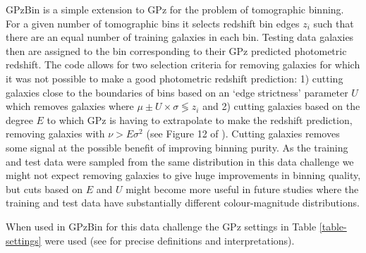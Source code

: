 \documentclass[twocolumn,twocolappendix]{aastex63}
\begin{document}


GPzBin is a simple extension to GPz for the problem of tomographic binning. For
a given number of tomographic bins it selects redshift bin edges $z_{i}$ such
that there are an equal number of training galaxies in each bin. Testing data
galaxies then are assigned to the bin corresponding to their GPz predicted
photometric redshift. The code allows for two selection criteria for removing
galaxies for which it was not possible to make a good photometric redshift
prediction: 1) cutting galaxies close to the boundaries of bins based on an
`edge strictness' parameter $U$ which removes galaxies where $\mu\pm U \times
\sigma \lessgtr z_i$ and 2) cutting galaxies based on the degree $E$ to which
GPz is having to extrapolate to make the redshift prediction, removing galaxies
with $\nu>E\sigma^2$ (see Figure 12 of \citealp{Hatfield2020}). Cutting galaxies
removes some signal at the possible benefit of improving binning purity. As the
training and test data were sampled from the same distribution in this data
challenge we might not expect removing galaxies to give huge improvements in
binning quality, but cuts based on $E$ and $U$ might become more useful in
future studies where the training and test data have substantially different
colour-magnitude distributions.

When used in GPzBin for this data challenge the GPz settings
in Table \ref{table-settings} were used (see
\citealp{Almosallam2016a,Almosallam2016b} for precise definitions and
interpretations).

\end{document}
